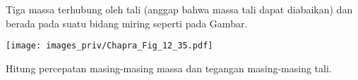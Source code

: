 \begin{soal}
Tiga massa terhubung oleh tali (anggap bahwa massa tali dapat diabaikan)
dan berada pada suatu bidang miring seperti pada Gambar.

{\centering
\texttt{[image: images\_priv/Chapra\_Fig\_12\_35.pdf]}
\par}

Hitung percepatan masing-masing massa dan tegangan masing-masing tali.
\end{soal}